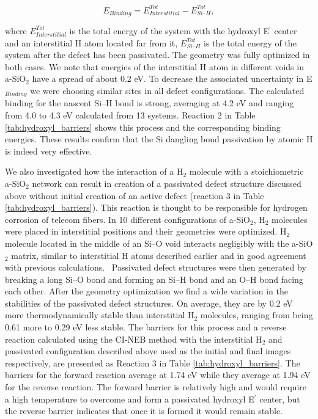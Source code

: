 \documentclass[aps,prb,reprint,superscriptaddress,showpacs]{revtex4-1}
\begin{document}
\begin{equation}
E_{Binding}=E^{Tot}_{Interstitial}-E^{Tot}_{Si\text{--}H},
\label{eq:binding}
\end{equation}

where $E^{Tot}_{Interstitial}$ is the total energy of the system with the hydroxyl E$^\prime$ center and an interstitial H atom located far from it, $E^{Tot}_{Si\text{--}H}$ is the total energy of the system after the defect has been passivated. The geometry was fully optimized in both cases. We note that energies of the interstitial H atom in different voids in a-SiO$_2$ have a spread of about 0.2 eV. To decrease the associated uncertainty in E$_{Binding}$ we were choosing similar sites in all defect configurations. The calculated binding for the nascent \mbox{Si--H} bond is strong, averaging at 4.2 eV and ranging from 4.0 to 4.3 eV calculated from 13 systems. Reaction 2 in Table \ref{tab:hydroxyl_barriers} shows this process and the corresponding binding energies. These results confirm that the Si dangling bond passivation by atomic H is indeed very effective. 

We also investigated how the interaction of a H$_2$ molecule with a stoichiometric a-SiO$_2$ network can result in creation of a passivated defect structure discussed above without initial creation of an active defect (reaction 3 in Table \ref{tab:hydroxyl_barriers}). This reaction is thought to be responsible for hydrogen corrosion of telecom fibers. In 10 different configurations of a-SiO$_2$, H$_2$ molecules were placed in interstitial positions and their geometries were optimized. H$_2$ molecule located in the middle of an \mbox{Si--O} void interacts negligibly with the a-SiO$_2$ matrix, similar to interstitial H atoms described earlier and in good agreement with previous calculations.~\cite{BUNSON99,blochl_vacancies} Passivated defect structures were then generated by breaking a long \mbox{Si--O} bond and forming an \mbox{Si--H} bond and an \mbox{O--H} bond facing each other. After the geometry optimization we find a wide variation in the stabilities of the passivated defect structures. On average, they are by 0.2 eV more thermodynamically stable than interstitial H$_2$ molecules, ranging from being 0.61 more to 0.29 eV less stable. The barriers for this process and a reverse reaction calculated using the CI-NEB method with the interstitial H$_2$ and passivated configuration described above used as the initial and final images respectively, are presented as Reaction 3 in Table \ref{tab:hydroxyl_barriers}. The barriers for the forward reaction average at 1.74 eV while they average at 1.94 eV for the reverse reaction. The forward barrier is relatively high and would require a high temperature to overcome and form a passivated hydroxyl E$^\prime$ center, but the reverse barrier indicates that once it is formed it would remain stable.
\end{document}
